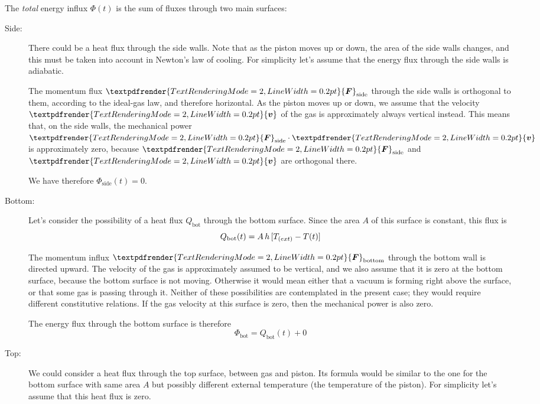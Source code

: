 \documentclass[a4paper,12pt,%
onecolumn,oneside,%
british%
]{memoir}
\renewcommand*{\bm}[1]{\textpdfrender{TextRenderingMode=2,LineWidth=0.2pt}{\boldsymbol{#1}}}
\renewcommand*{\|}[1][]{\nonscript\:#1\vert\nonscript\:\mathopen{}}
\newcommand*{\yhea}{h} %
\newcommand*{\yv}{\bm{v}}
\newcommand*{\yH}{\varPhi}%
\newcommand*{\yQb}{Q_{\text{bot}}}%
\newcommand*{\yF}{\bm{F}}
\newcommand*{\yT}{T}%
\newcommand*{\yTe}{\yT_{\text(ext)}}%
\begin{document}
The \emph{total} energy influx $\yH(t)$ is the sum of fluxes through two main surfaces:
\begin{description}
\item[Side:] There could be a heat flux through the side walls. Note that as the piston moves up or down, the area of the side walls changes, and this must be taken into account in Newton's law of cooling. For simplicity let's assume that the energy flux through the side walls is adiabatic.

  The momentum flux $\yF_{\text{side}}$ through the side walls is orthogonal to them, according to the ideal-gas law, and therefore horizontal. As the piston moves up or down, we assume that the velocity $\yv$ of the gas is approximately always vertical instead. This means that, on the side walls, the mechanical power $\yF_{\text{side}}\cdot\yv$ is approximately zero, because $\yF_{\text{side}}$ and $\yv$ are orthogonal there.

  We have therefore $\yH_{\text{side}}(t) = 0$.

\item[Bottom:] Let's consider the possibility of a heat flux $\yQb$ through the bottom surface. Since the area $A$ of this surface is constant, this flux is
  \begin{equation*}
    \yQb(t) = A\,\yhea\,[\yTe-\yT(t)]
  \end{equation*}

  The momentum influx $\yF_{\text{bottom}}$ through the bottom wall is directed upward. The velocity of the gas is approximately assumed to be vertical, and we also assume that it is zero at the bottom surface, because the bottom surface is not moving. Otherwise it would mean either that a vacuum is forming right above the surface, or that some gas is passing through it. Neither of these possibilities are contemplated in the present case; they would require different constitutive relations. If the gas velocity at this surface is zero, then the mechanical power is also zero.

  The energy flux through the bottom surface is therefore
  \begin{equation*}
    \yH_{\text{bot}} = \yQb(t) + 0
  \end{equation*}

\item[Top:] We could consider a heat flux through the top surface, between gas and piston. Its formula would be similar to the one for the bottom surface with same area $A$ but possibly different external temperature (the temperature of the piston). For simplicity let's assume that this heat flux is zero.


\end{description}
\end{document}

